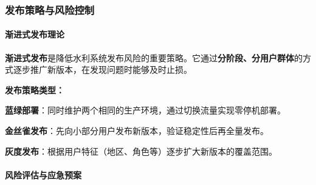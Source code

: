\begin{Shaded}
\begin{Highlighting}[]
\KeywordTok{:}
\KeywordTok{:}\AttributeTok{ }\KeywordTok{[}\KeywordTok{,}\KeywordTok{]}
\KeywordTok{:}
\AttributeTok{  }\KeywordTok{:}
\AttributeTok{    }\KeywordTok{:}
\AttributeTok{    }\KeywordTok{:}
\AttributeTok{      }\KeywordTok{{-}}\AttributeTok{ }\KeywordTok{:}
\AttributeTok{        }\KeywordTok{:}
\AttributeTok{      }\KeywordTok{{-}}\AttributeTok{ }\KeywordTok{:}
\AttributeTok{        }\KeywordTok{:}
\AttributeTok{      }\KeywordTok{{-}}\AttributeTok{ }\KeywordTok{:}
\AttributeTok{        }\KeywordTok{:}
\end{Highlighting}
\end{Shaded}

\subsubsection{发布策略与风险控制}\label{ux53d1ux5e03ux7b56ux7565ux4e0eux98ceux9669ux63a7ux5236}

\paragraph{渐进式发布理论}\label{ux6e10ux8fdbux5f0fux53d1ux5e03ux7406ux8bba}

\textbf{渐进式发布}是降低水利系统发布风险的重要策略。它通过\textbf{分阶段、分用户群体}的方式逐步推广新版本，在发现问题时能够及时止损。

\textbf{发布策略类型：}

\textbf{蓝绿部署}：同时维护两个相同的生产环境，通过切换流量实现零停机部署。

\textbf{金丝雀发布}：先向小部分用户发布新版本，验证稳定性后再全量发布。

\textbf{灰度发布}：根据用户特征（地区、角色等）逐步扩大新版本的覆盖范围。

\paragraph{风险评估与应急预案}\label{ux98ceux9669ux8bc4ux4f30ux4e0eux5e94ux6025ux9884ux6848}

